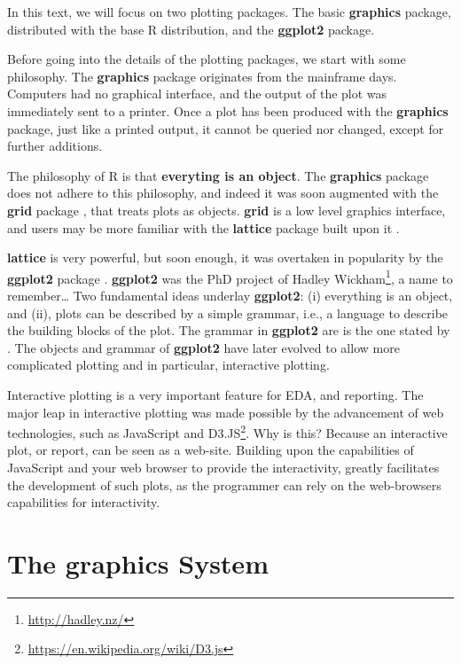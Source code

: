 \documentclass[]{book}
\renewcommand{\href}[2]{#2\footnote{\url{#1}}}
\theoremstyle{definition}
\theoremstyle{definition}
\theoremstyle{definition}
\theoremstyle{remark}
\begin{document}
In this text, we will focus on two plotting packages.
The basic \textbf{graphics} package, distributed with the base R distribution, and the \textbf{ggplot2} package.

Before going into the details of the plotting packages, we start with some philosophy.
The \textbf{graphics} package originates from the mainframe days.
Computers had no graphical interface, and the output of the plot was immediately sent to a printer.
Once a plot has been produced with the \textbf{graphics} package, just like a printed output, it cannot be queried nor changed, except for further additions.

The philosophy of R is that \textbf{everyting is an object}.
The \textbf{graphics} package does not adhere to this philosophy, and indeed it was soon augmented with the \textbf{grid} package \citep{Rlanguage}, that treats plots as objects.
\textbf{grid} is a low level graphics interface, and users may be more familiar with the \textbf{lattice} package built upon it \citep{lattice}.

\textbf{lattice} is very powerful, but soon enough, it was overtaken in popularity by the \textbf{ggplot2} package \citep{ggplot2}.
\textbf{ggplot2} was the PhD project of \href{http://hadley.nz/}{Hadley Wickham}, a name to remember\ldots{}
Two fundamental ideas underlay \textbf{ggplot2}: (i) everything is an object, and (ii), plots can be described by a simple grammar, i.e., a language to describe the building blocks of the plot.
The grammar in \textbf{ggplot2} are is the one stated by \citet{wilkinson2006grammar}.
The objects and grammar of \textbf{ggplot2} have later evolved to allow more complicated plotting and in particular, interactive plotting.

Interactive plotting is a very important feature for EDA, and reporting.
The major leap in interactive plotting was made possible by the advancement of web technologies, such as JavaScript and \href{https://en.wikipedia.org/wiki/D3.js}{D3.JS}.
Why is this?
Because an interactive plot, or report, can be seen as a web-site.
Building upon the capabilities of JavaScript and your web browser to provide the interactivity, greatly facilitates the development of such plots, as the programmer can rely on the web-browsers capabilities for interactivity.

\hypertarget{the-graphics-system}{%
\section{The graphics System}\label{the-graphics-system}}
\end{document}
